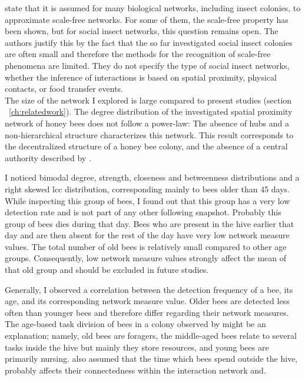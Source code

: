 \textcite{charbonneau2013social} state that it is assumed for many biological networks, including insect colonies, to approximate scale-free networks.
For some of them, the scale-free property has been shown, but for social insect networks, this question remains open.
The authors justify this by the fact that the so far investigated social insect colonies are often small and therefore the methods for the recognition of scale-free phenomena are limited.
They do not specify the type of social insect networks, whether the inference of interactions is based on spatial proximity, physical contacts, or food transfer events.\\
The size of the network I explored is large compared to present studies (section ~\ref{ch:relatedwork}). The degree distribution of the investigated spatial proximity network of honey bees does not follow a power-law:
The absence of hubs and a non-hierarchical structure characterizes this network.
This result corresponds to the decentralized structure of a honey bee colony, and the absence of a central authority described by \textcite{seeley1989honey}.


I noticed bimodal degree, strength, closeness and betweenness distributions and a right skewed lcc distribution, corresponding mainly to bees older than 45 days.
While inspecting this group of bees, I found out that this group has a very low detection rate and is not part of any other following snapshot. Probably this group of bees dies during that day. Bees who are present in the hive earlier that day and are then absent for the rest of the day have very low network measure values. The total number of old bees is relatively small compared to other age groups. Consequently, low network measure values strongly affect the mean of that old group and should be excluded in future studies.


Generally, I observed a correlation between the detection frequency of a bee, its age, and its corresponding network measure value. Older bees are detected less often than younger bees and therefore differ regarding their network measures.
The age-based task division of bees in a colony observed by \textcite{seeley1989social} might be an explanation; namely, old bees are foragers, the middle-aged bees relate to several tasks inside the hive but mainly they store resources, and young bees are primarily nursing.
\textcite{baracchi2014socio} also assumed that the time which bees spend outside the hive, probably affects their connectedness within the interaction network and.

